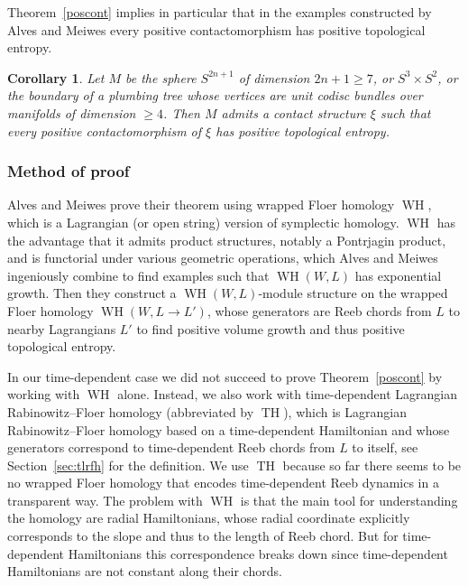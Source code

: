 \documentclass{amsart}
\renewcommand{\TH}{\operatorname{TH}}
\newcommand{\WslantH}{\operatorname{WH}}
\newtheorem{corollary}[theorem]{Corollary}
\theoremstyle{definition}
\theoremstyle{remark}
\numberwithin{equation}{section}
\begin{document}
Theorem~\ref{poscont} implies in particular that in the examples constructed by Alves and Meiwes every positive contactomorphism has positive topological entropy.
\begin{corollary}
	Let $M$ be the sphere $S^{2n+1}$ of dimension $2n+1\geq 7$, or $S^3\times S^2$, or the boundary of a plumbing tree whose vertices are unit codisc bundles over manifolds of dimension $\geq 4$. Then $M$ admits a contact structure $\xi$ such that every positive contactomorphism of $\xi$ has positive topological entropy.  
\end{corollary}

\subsubsection*{Method of proof} Alves and Meiwes prove their theorem using wrapped Floer homology $\WslantH$, which is a Lagrangian (or open string) version of symplectic homology. $\WslantH$ has the advantage that it admits product structures, notably a Pontrjagin product, and is functorial under various geometric operations, which Alves and Meiwes ingeniously combine to find examples such that $\WslantH(W,L)$ has exponential growth. Then they construct a $\WslantH(W,L)$-module structure on the wrapped Floer homology $\WslantH(W,L\to L')$, whose generators are Reeb chords from $L$ to nearby Lagrangians $L'$ to find positive volume growth and thus positive topological entropy.

In our time-dependent case we did not succeed to prove Theorem~\ref{poscont} by working with $\WslantH$ alone. Instead, we also work with time-dependent Lagrangian Rabinowitz--Floer homology (abbreviated by $\TH$), which is Lagrangian Rabinowitz--Floer homology based on a time-dependent Hamiltonian and whose generators correspond to time-dependent Reeb chords from $L$ to itself, see Section~\ref{sec:tlrfh} for the definition. We use $\TH$ because so far there seems to be no wrapped Floer homology that encodes time-dependent Reeb dynamics in a transparent way. The problem with $\WslantH$ is that the main tool for understanding the homology are radial Hamiltonians, whose radial coordinate explicitly corresponds to the slope and thus to the length of Reeb chord. But for time-dependent Hamiltonians this correspondence breaks down since time-dependent Hamiltonians are not constant along their chords. 
\end{document}
